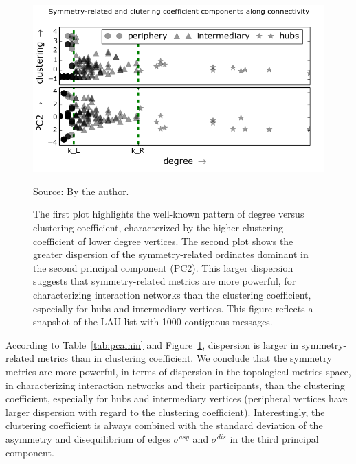 \begin{figure} 
\centering
 \includegraphics[width=.45\textwidth]{figs/im13PCAPLOT__}
\caption{The first plot highlights the well-known pattern of degree versus clustering coefficient, characterized by the higher clustering coefficient of lower degree vertices.
 The second plot shows the greater dispersion of the symmetry-related ordinates dominant in the second principal component (PC2).
 This larger dispersion suggests that symmetry-related metrics are more powerful,
 for characterizing interaction networks than the clustering coefficient,
 especially for hubs and intermediary vertices.
 This figure reflects a snapshot of the LAU list with 1000 contiguous messages.}

 \label{fig:sym}
 \begin{flushleft}\footnotesize
Source: By the author.\
\end{flushleft}
\end{figure}

According to Table~\ref{tab:pcainin} and Figure~\ref{fig:sym},
dispersion is larger in symmetry-related metrics than in clustering coefficient.
We conclude that the symmetry metrics are more powerful, in terms of dispersion in the topological metrics space, in characterizing interaction networks and their participants, than the clustering coefficient, especially for hubs and intermediary vertices (peripheral vertices have larger dispersion with regard to the clustering coefficient).
Interestingly, the clustering coefficient is always combined
with the standard deviation of the asymmetry and disequilibrium
of edges $\sigma^{asy}$ and $\sigma^{dis}$ in the third principal component.

